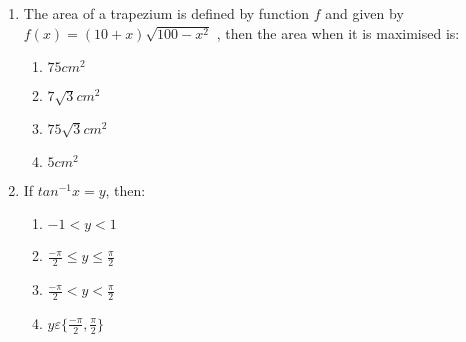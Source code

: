 \documentclass{article}
\begin{document}
\begin{enumerate}
\item The area of a trapezium is defined by function $f$ and given by $f(x) = (10 + x)\sqrt{100-x^2}$
, then the area when it is maximised is: 
\begin{enumerate}
    \item $75cm^2$
    \item $7\sqrt{3}cm^2$
    \item $75\sqrt{3}cm^2$
    \item $5cm^2$
\end{enumerate}

\item If $tan^{-1} x = y$, then: 
\begin{enumerate}
    \item $-1 < y < 1$
    \item $\frac{-\pi}{2} \leq y \leq \frac{\pi}{2}$
    \item $\frac{-\pi}{2} < y < \frac{\pi}{2}$
    \item $y \varepsilon\{\frac{-\pi}{2},\frac{\pi}{2}\}$
\end{enumerate}


\end{enumerate}
\end{document}
